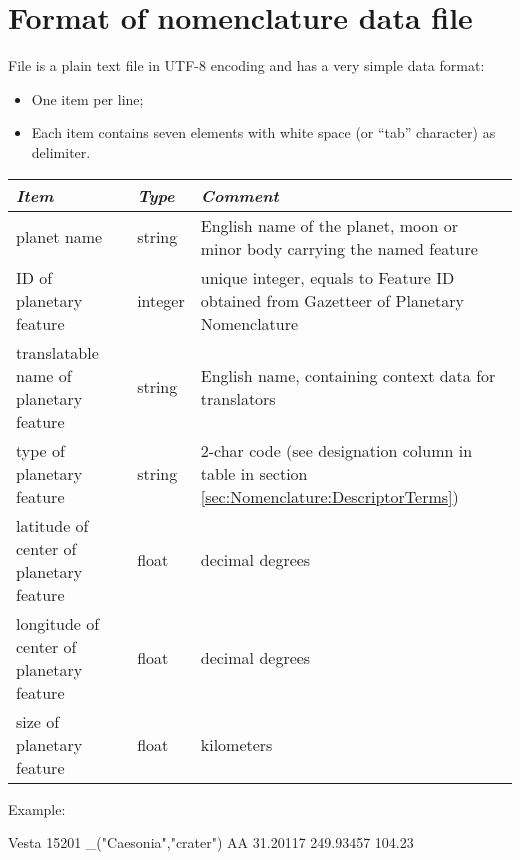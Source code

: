 \section{Format of nomenclature data file}
\label{sec:Nomenclature:format}

File  is a plain text file in UTF-8 encoding and has a very simple data format: 
\begin{itemize}
\item One item per line;
\item Each item contains seven elements with white space (or ``tab'' character) as delimiter.
\end{itemize}

\begin{longtabu} to \textwidth {l|l|X}\toprule
\emph{Item}                              & \emph{Type} & \emph{Comment}\\\midrule
planet name                              & string  & English name of the planet, moon or minor body carrying the named feature\\\midrule
ID of planetary feature                  & integer & unique integer, equals to Feature ID obtained from Gazetteer of Planetary Nomenclature\\\midrule
translatable name of planetary feature   & string  & English name, containing context data for translators\\\midrule
type of planetary feature                & string  & 2-char code (see designation column in table in section \ref{sec:Nomenclature:DescriptorTerms})\\\midrule
latitude of center of planetary feature  & float   & decimal degrees\\\midrule
longitude of center of planetary feature & float   & decimal degrees\\\midrule
size of planetary feature                & float   & kilometers\\\bottomrule
\end{longtabu}

Example:
\begin{configfile}
Vesta 15201 _("Caesonia","crater") AA 31.20117 249.93457 104.23
\end{configfile}

